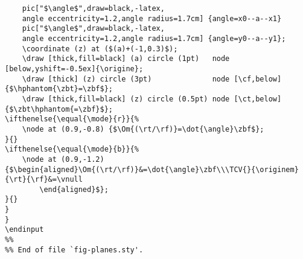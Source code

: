 \documentclass[a4paper,9pt]{article}
\begin{document}
\begin{verbatim}
    pic["$\angle$",draw=black,-latex,
    angle eccentricity=1.2,angle radius=1.7cm] {angle=x0--a--x1}
    pic["$\angle$",draw=black,-latex,
    angle eccentricity=1.2,angle radius=1.7cm] {angle=y0--a--y1};
    \coordinate (z) at ($(a)+(-1,0.3)$);
    \draw [thick,fill=black] (a) circle (1pt)   node [below,yshift=-0.5ex]{\origine};
    \draw [thick] (z) circle (3pt)              node [\cf,below] {$\hphantom{\zbt}=\zbf$};
    \draw [thick,fill=black] (z) circle (0.5pt) node [\ct,below] {$\zbt\hphantom{=\zbf}$};
\ifthenelse{\equal{\mode}{r}}{%
    \node at (0.9,-0.8) {$\Om{(\rt/\rf)}=\dot{\angle}\zbf$};
}{}
\ifthenelse{\equal{\mode}{b}}{%
    \node at (0.9,-1.2) {$\begin{aligned}\Om{(\rt/\rf)}&=\dot{\angle}\zbf\\\TCV{}{\originem}{\rt}{\rf}&=\vnull
        \end{aligned}$};
}{}
}
}
\endinput
%%
%% End of file `fig-planes.sty'.
\end{verbatim}
\end{document}
